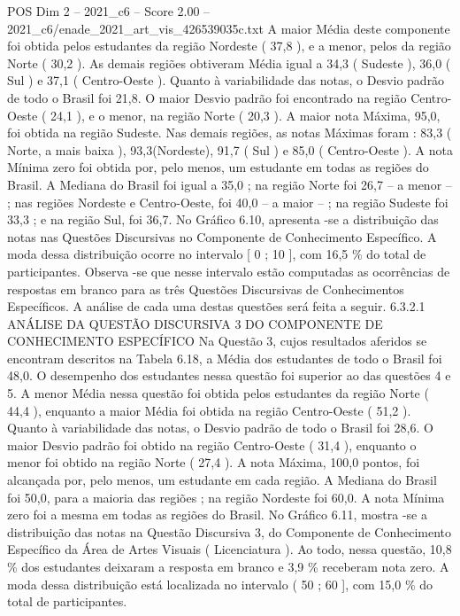 \begin{textsample}{POS Dim 2 – 2021\_c6 – Score 2.00 – 2021\_c6/enade\_2021\_art\_vis\_426539035c.txt}
A maior Média deste componente foi obtida pelos estudantes da região Nordeste ( 37,8 ), e a menor, pelos da região Norte ( 30,2 ).
As demais regiões obtiveram Média igual a 34,3 ( Sudeste ), 36,0 ( Sul ) e 37,1 ( Centro-Oeste ).
Quanto à variabilidade das notas, o Desvio padrão de todo o Brasil foi 21,8.
O maior Desvio padrão foi encontrado na região Centro-Oeste ( 24,1 ), e o menor, na região Norte ( 20,3 ).
A maior nota Máxima, 95,0, foi obtida na região Sudeste.
Nas demais regiões, as notas Máximas foram : 83,3 ( Norte, a mais baixa ), 93,3(Nordeste), 91,7 ( Sul ) e 85,0 ( Centro-Oeste ).
A nota Mínima zero foi obtida por, pelo menos, um estudante em todas as regiões do Brasil.
A Mediana do Brasil foi igual a 35,0 ; na região Norte foi 26,7 – a menor – ; nas regiões Nordeste e Centro-Oeste, foi 40,0 – a maior – ; na região Sudeste foi 33,3 ; e na região Sul, foi 36,7.
No Gráfico 6.10, apresenta -se a distribuição das notas nas Questões Discursivas no Componente de Conhecimento Específico.
A moda dessa distribuição ocorre no intervalo [ 0 ; 10 ], com 16,5 \% do total de participantes.
Observa -se que nesse intervalo estão computadas as ocorrências de respostas em branco para as três Questões Discursivas de Conhecimentos Específicos.
A análise de cada uma destas questões será feita a seguir. 6.3.2.1 ANÁLISE DA QUESTÃO DISCURSIVA 3 DO COMPONENTE DE CONHECIMENTO ESPECÍFICO Na Questão 3, cujos resultados aferidos se encontram descritos na Tabela 6.18, a Média dos estudantes de todo o Brasil foi 48,0.
O desempenho dos estudantes nessa questão foi superior ao das questões 4 e 5.
A menor Média nessa questão foi obtida pelos estudantes da região Norte ( 44,4 ), enquanto a maior Média foi obtida na região Centro-Oeste ( 51,2 ).
Quanto à variabilidade das notas, o Desvio padrão de todo o Brasil foi 28,6.
O maior Desvio padrão foi obtido na região Centro-Oeste ( 31,4 ), enquanto o menor foi obtido na região Norte ( 27,4 ).
A nota Máxima, 100,0 pontos, foi alcançada por, pelo menos, um estudante em cada região.
A Mediana do Brasil foi 50,0, para a maioria das regiões ; na região Nordeste foi 60,0.
A nota Mínima zero foi a mesma em todas as regiões do Brasil.
No Gráfico 6.11, mostra -se a distribuição das notas na Questão Discursiva 3, do Componente de Conhecimento Específico da Área de Artes Visuais ( Licenciatura ).
Ao todo, nessa questão, 10,8 \% dos estudantes deixaram a resposta em branco e 3,9 \% receberam nota zero.
A moda dessa distribuição está localizada no intervalo ( 50 ; 60 ], com 15,0 \% do total de participantes.

\end{textsample}
